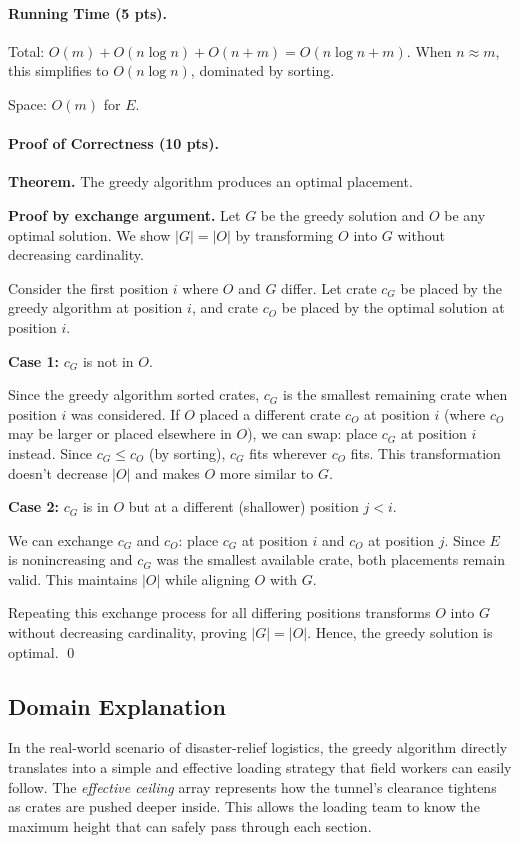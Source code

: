 \documentclass[sigconf]{acmart}
\begin{document}
\paragraph{Running Time (5 pts).}
Total: $O(m) + O(n \log n) + O(n + m) = O(n \log n + m)$. When $n \approx m$, this simplifies to $O(n \log n)$, dominated by sorting. 

Space: $O(m)$ for $E$.

\paragraph{Proof of Correctness (10 pts).}

\textbf{Theorem.} The greedy algorithm produces an optimal placement.

\textbf{Proof by exchange argument.}
Let $G$ be the greedy solution and $O$ be any optimal solution. We show $|G| = |O|$ by transforming $O$ into $G$ without decreasing cardinality.

Consider the first position $i$ where $O$ and $G$ differ. Let crate $c_G$ be placed by the greedy algorithm at position $i$, and crate $c_O$ be placed by the optimal solution at position $i$.

\textbf{Case 1:} $c_G$ is not in $O$.

Since the greedy algorithm sorted crates, $c_G$ is the smallest remaining crate when position $i$ was considered. If $O$ placed a different crate $c_O$ at position $i$ (where $c_O$ may be larger or placed elsewhere in $O$), we can swap: place $c_G$ at position $i$ instead. Since $c_G \leq c_O$ (by sorting), $c_G$ fits wherever $c_O$ fits. This transformation doesn't decrease $|O|$ and makes $O$ more similar to $G$.

\textbf{Case 2:} $c_G$ is in $O$ but at a different (shallower) position $j < i$.

We can exchange $c_G$ and $c_O$: place $c_G$ at position $i$ and $c_O$ at position $j$. Since $E$ is nonincreasing and $c_G$ was the smallest available crate, both placements remain valid. This maintains $|O|$ while aligning $O$ with $G$.

Repeating this exchange process for all differing positions transforms $O$ into $G$ without decreasing cardinality, proving $|G| = |O|$. Hence, the greedy solution is optimal. \qed


\subsection{Domain Explanation}
\label{subsec:domain-greedy}
In the real-world scenario of disaster-relief logistics, the greedy algorithm directly translates into a simple and effective loading strategy that field workers can easily follow. The \emph{effective ceiling} array represents how the tunnel's clearance tightens as crates are pushed deeper inside. This allows the loading team to know the maximum height that can safely pass through each section.
\end{document}
